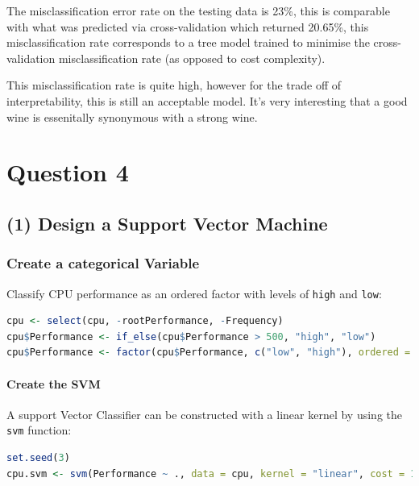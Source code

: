 \documentclass[
]{article}
\newcommand{\passthrough}[1]{#1}
\begin{document}
The misclassification error rate on the testing data is 23\%, this is
comparable with what was predicted via cross-validation which returned
20.65\%, this misclassification rate corresponds to a tree model trained
to minimise the cross-validation misclassification rate (as opposed to
cost complexity).

This misclassification rate is quite high, however for the trade off of
interpretability, this is still an acceptable model. It's very
interesting that a good wine is essenitally synonymous with a strong
wine.

\newpage

\hypertarget{question-4}{%
\section{Question 4}\label{question-4}}

\hypertarget{design-a-support-vector-machine}{%
\subsection{(1) Design a Support Vector
Machine}\label{design-a-support-vector-machine}}

\hypertarget{create-a-categorical-variable}{%
\subsubsection{Create a categorical
Variable}\label{create-a-categorical-variable}}

Classify CPU performance as an ordered factor with levels of
\passthrough{\lstinline!high!} and \passthrough{\lstinline!low!}:

\begin{lstlisting}[language=R]
cpu <- select(cpu, -rootPerformance, -Frequency)
cpu$Performance <- if_else(cpu$Performance > 500, "high", "low")
cpu$Performance <- factor(cpu$Performance, c("low", "high"), ordered = TRUE)
\end{lstlisting}



\hypertarget{create-the-svm}{%
\paragraph{Create the SVM}\label{create-the-svm}}


A support Vector Classifier can be constructed with a linear kernel by
using the \passthrough{\lstinline!svm!} function:

\begin{lstlisting}[language=R]
set.seed(3)
cpu.svm <- svm(Performance ~ ., data = cpu, kernel = "linear", cost = 10, scale = FALSE)
\end{lstlisting}
\end{document}
